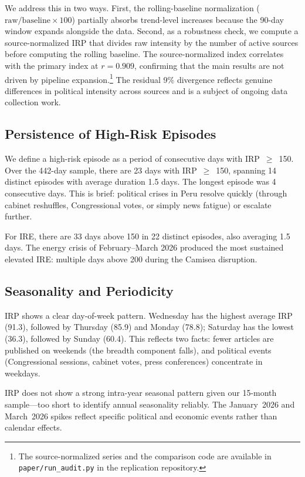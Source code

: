 \documentclass[12pt,a4paper]{article}
\begin{document}
We address this in two ways.  First, the rolling-baseline normalization
($\text{raw}/\text{baseline} \times 100$) partially absorbs trend-level
increases because the 90-day window expands alongside the data.  Second,
as a robustness check, we compute a source-normalized IRP that divides raw
intensity by the number of active sources before computing the rolling
baseline.  The source-normalized index correlates with the primary index
at $r = 0.909$, confirming that the main results are not driven by
pipeline expansion.\footnote{The source-normalized series and the
comparison code are available in \texttt{paper/run\_audit.py} in the
replication repository.}  The residual 9\% divergence reflects genuine
differences in political intensity across sources and is a subject of
ongoing data collection work.

\subsection{Persistence of High-Risk Episodes}
\label{subsec:persistence}

We define a high-risk episode as a period of consecutive days with
IRP~$\geq$~150.  Over the 442-day sample, there are 23 days with
IRP~$\geq$~150, spanning 14 distinct episodes with average duration 1.5
days.  The longest episode was 4 consecutive days.  This is brief: political
crises in Peru resolve quickly (through cabinet reshuffles, Congressional
votes, or simply news fatigue) or escalate further.

For IRE, there are 33 days above 150 in 22 distinct episodes, also
averaging 1.5 days.  The energy crisis of February--March 2026 produced the
most sustained elevated IRE: multiple days above 200 during the Camisea
disruption.

\subsection{Seasonality and Periodicity}
\label{subsec:seasonality}

IRP shows a clear day-of-week pattern.  Wednesday has the highest average
IRP (91.3), followed by Thursday (85.9) and Monday (78.8); Saturday has the
lowest (36.3), followed by Sunday (60.4).  This reflects two facts: fewer
articles are published on weekends (the breadth component falls), and
political events (Congressional sessions, cabinet votes, press conferences)
concentrate in weekdays.

IRP does not show a strong intra-year seasonal pattern given our 15-month
sample---too short to identify annual seasonality reliably.  The January~2026
and March~2026 spikes reflect specific political and economic events rather
than calendar effects.
\end{document}
